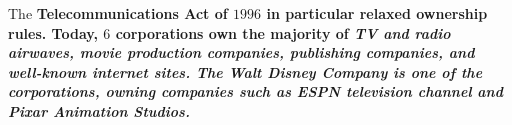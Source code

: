 The \bf{Telecommunications Act} of $1996$ in particular relaxed ownership rules. Today, $6$ corporations own the majority of \it{TV and radio airwaves, movie production companies, publishing companies, and well-known internet sites}. The \bf{Walt Disney Company} is one of the corporations, owning companies such as \bf{ESPN television channel} and \bf{Pixar Animation Studios}.

\newpage
